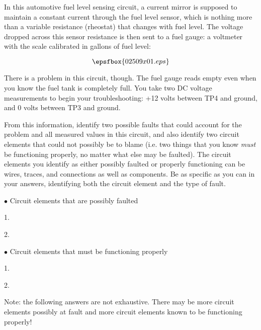 

In this automotive fuel level sensing circuit, a current mirror is supposed to maintain a constant current through the fuel level sensor, which is nothing more than a variable resistance (rheostat) that changes with fuel level.  The voltage dropped across this sensor resistance is then sent to a fuel gauge: a voltmeter with the scale calibrated in gallons of fuel level:

$$\epsfbox{02509x01.eps}$$

There is a problem in this circuit, though.  The fuel gauge reads empty even when you know the fuel tank is completely full.  You take two DC voltage measurements to begin your troubleshooting: +12 volts between TP4 and ground, and 0 volts between TP3 and ground.

From this information, identify two possible faults that could account for the problem and all measured values in this circuit, and also identify two circuit elements that could not possibly be to blame (i.e. two things that you know {\it must} be functioning properly, no matter what else may be faulted).  The circuit elements you identify as either possibly faulted or properly functioning can be wires, traces, and connections as well as components.  Be as specific as you can in your answers, identifying both the circuit element and the type of fault.

\medskip
\goodbreak
\item{$\bullet$} Circuit elements that are possibly faulted
\item{1.}
\item{2.} 
\medskip

\medskip
\goodbreak
\item{$\bullet$} Circuit elements that must be functioning properly
\item{1.} 
\item{2.} 
\medskip







Note: the following answers are not exhaustive.  There may be more circuit elements possibly at fault and more circuit elements known to be functioning properly!

